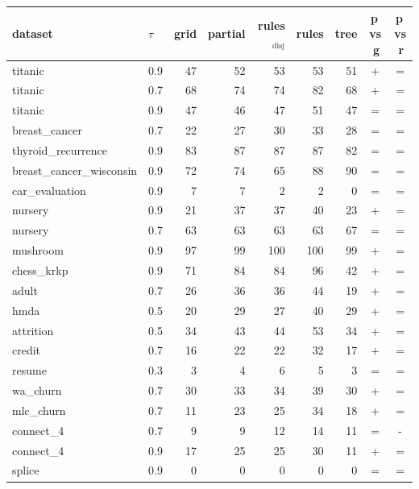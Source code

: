 \begin{tabular}{llrrrrrcc}
\toprule
dataset & $\tau$ & grid & partial & rules$_{\mathrm{disj}}$ & rules & tree & p$\,$vs$\,$g & p$\,$vs$\,$r\\
\midrule
titanic & 0.9 & 47 & 52 & 53 & 53 & 51 & + & =\\
titanic & 0.7 & 68 & 74 & 74 & 82 & 68 & + & =\\
titanic & 0.9 & 47 & 46 & 47 & 51 & 47 & = & =\\
breast\_cancer & 0.7 & 22 & 27 & 30 & 33 & 28 & = & =\\
thyroid\_recurrence & 0.9 & 83 & 87 & 87 & 87 & 82 & = & =\\
breast\_cancer\_wisconsin & 0.9 & 72 & 74 & 65 & 88 & 90 & = & =\\
car\_evaluation & 0.9 & 7 & 7 & 2 & 2 & 0 & = & =\\
nursery & 0.9 & 21 & 37 & 37 & 40 & 23 & + & =\\
nursery & 0.7 & 63 & 63 & 63 & 63 & 67 & = & =\\
mushroom & 0.9 & 97 & 99 & 100 & 100 & 99 & + & =\\
chess\_krkp & 0.9 & 71 & 84 & 84 & 96 & 42 & + & =\\
adult & 0.7 & 26 & 36 & 36 & 44 & 19 & + & =\\
hmda & 0.5 & 20 & 29 & 27 & 40 & 29 & + & =\\
attrition & 0.5 & 34 & 43 & 44 & 53 & 34 & + & =\\
credit & 0.7 & 16 & 22 & 22 & 32 & 17 & + & =\\
resume & 0.3 & 3 & 4 & 6 & 5 & 3 & = & =\\
wa\_churn & 0.7 & 30 & 33 & 34 & 39 & 30 & + & =\\
mlc\_churn & 0.7 & 11 & 23 & 25 & 34 & 18 & + & =\\
connect\_4 & 0.7 & 9 & 9 & 12 & 14 & 11 & = & -\\
connect\_4 & 0.9 & 17 & 25 & 25 & 30 & 11 & + & =\\
splice & 0.9 & 0 & 0 & 0 & 0 & 0 & = & =\\
\bottomrule
\end{tabular}
